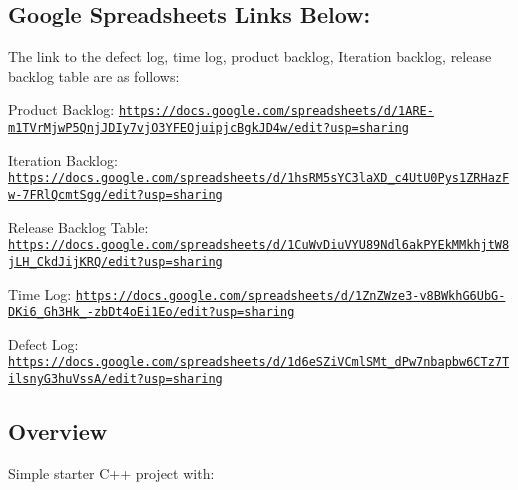 \href{https://travis-ci.org/Akshaybj0221/ENPM808X_Midterm}{\tt } \subsection*{\href{https://coveralls.io/github/Akshaybj0221/ENPM808X_Midterm}{\tt } }

\subsection*{Google Spreadsheets Links Below\+:}

The link to the defect log, time log, product backlog, Iteration backlog, release backlog table are as follows\+:

Product Backlog\+: \href{https://docs.google.com/spreadsheets/d/1ARE-m1TVrMjwP5QnjJDIy7vjO3YFEOjuipjcBgkJD4w/edit?usp=sharing}{\tt https\+://docs.\+google.\+com/spreadsheets/d/1\+A\+R\+E-\/m1\+T\+Vr\+Mjw\+P5\+Qnj\+J\+D\+Iy7vj\+O3\+Y\+F\+E\+Ojuipjc\+Bgk\+J\+D4w/edit?usp=sharing}

Iteration Backlog\+: \href{https://docs.google.com/spreadsheets/d/1hsRM5sYC3laXD_c4UtU0Pys1ZRHazFw-7FRlQcmtSgg/edit?usp=sharing}{\tt https\+://docs.\+google.\+com/spreadsheets/d/1hs\+R\+M5s\+Y\+C3la\+X\+D\+\_\+c4\+Ut\+U0\+Pys1\+Z\+R\+Haz\+Fw-\/7\+F\+Rl\+Qcmt\+Sgg/edit?usp=sharing}

Release Backlog Table\+: \href{https://docs.google.com/spreadsheets/d/1CuWvDiuVYU89Ndl6akPYEkMMkhjtW8jLH_CkdJijKRQ/edit?usp=sharing}{\tt https\+://docs.\+google.\+com/spreadsheets/d/1\+Cu\+Wv\+Diu\+V\+Y\+U89\+Ndl6ak\+P\+Y\+Ek\+M\+Mkhjt\+W8j\+L\+H\+\_\+\+Ckd\+Jij\+K\+R\+Q/edit?usp=sharing}

Time Log\+: \href{https://docs.google.com/spreadsheets/d/1ZnZWze3-v8BWkhG6UbG-DKi6_Gh3Hk_-zbDt4oEi1Eo/edit?usp=sharing}{\tt https\+://docs.\+google.\+com/spreadsheets/d/1\+Zn\+Z\+Wze3-\/v8\+B\+Wkh\+G6\+Ub\+G-\/\+D\+Ki6\+\_\+\+Gh3\+Hk\+\_\+-\/zb\+Dt4o\+Ei1\+Eo/edit?usp=sharing}

Defect Log\+: \href{https://docs.google.com/spreadsheets/d/1d6eSZiVCmlSMt_dPw7nbapbw6CTz7TilsnyG3huVssA/edit?usp=sharing}{\tt https\+://docs.\+google.\+com/spreadsheets/d/1d6e\+S\+Zi\+V\+Cml\+S\+Mt\+\_\+d\+Pw7nbapbw6\+C\+Tz7\+Tilsny\+G3hu\+Vss\+A/edit?usp=sharing}

\subsection*{Overview}

Simple starter C++ project with\+:


